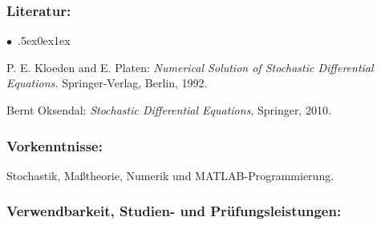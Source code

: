 \documentclass[a4paper,10pt]{article}
\renewenvironment{itemize}{\begin{list}{$\bullet$\ }{\itemsep.5ex\setlength{\topsep}{0.5\itemsep}\parsep0ex\labelsep1ex\settowidth{\labelwidth}{$\bullet$\ }\setlength{\leftmargin}{\labelwidth}\addtolength{\leftmargin}{3ex}\addtolength{\leftmargin}{\labelsep}}}{\end{list}}
\begin{document}
\subsubsection*{\large
    Literatur:
}
\begin{itemize}
\item
P. E. Kloeden and E. Platen: \emph{Numerical Solution of Stochastic Differential Equations.} Springer-Verlag, Berlin, 1992. 
\item
Bernt Oksendal: \emph{Stochastic Differential Equations}, Springer, 2010.
\end{itemize}
\subsubsection*{\large
    Vorkenntnisse:
}
Stochastik, Maßtheorie, Numerik und MATLAB-Programmierung.
\cleardoublepage
\subsubsection*{\large
    Verwendbarkeit, Studien- und Prüfungsleistungen:
}
\end{document}
